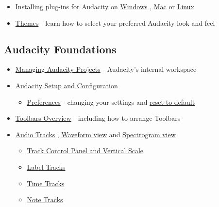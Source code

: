 \begin{multicols}{2}
\begin{itemize}
\item Installing plug-ins for Audacity on 
\hyperref[\foo{manXinstallingXeffectXgeneratorXandXanalyzerXplugXinsXonXwindowsX}]{Windows}
, 
\hyperref[\foo{manXinstallingXeffectXgeneratorXandXanalyzerXplugXinsXonXmacXosXxX}]{Mac}
 or 
\hyperref[\foo{manXinstallingXeffectXgeneratorXandXanalyzerXplugXinsXonXlinuxX}]{Linux}

\item 
\hyperref[\foo{manXthemesX}]{Themes}
 - learn how to select your preferred Audacity look and feel
\end{itemize}

\subsection{Audacity Foundations}
\begin{itemize}
\item 
\hyperref[\foo{manXaudacityXprojectsX}]{Managing Audacity Projects}
 - Audacity's internal workspace 
\item 
\hyperref[\foo{manXaudacityXsetupXandXconfigurationX}]{Audacity Setup and Configuration}

\begin{itemize}
\item 
\hyperref[\foo{manXpreferencesX}]{Preferences}
 - changing your settings and 
\hyperref[\foo{manXfaqXinstallationXandXplugXinsXreset}]{reset to default}

\end{itemize}

\item 
\hyperref[\foo{manXtoolbarsXoverviewX}]{Toolbars Overview}
 - including how to arrange Toolbars
\item 
\hyperref[\foo{manXaudioXtracksX}]{Audio Tracks}
, 
\hyperref[\foo{manXaudacityXwaveformX}]{Waveform view}
 and 
\hyperref[\foo{manXspectrogramXviewX}]{Spectrogram view}

\begin{itemize}
\item 
\hyperref[\foo{manXtrackXcontrolXpanelXandXverticalXscaleX}]{Track Control Panel and Vertical Scale}

\item 
\hyperref[\foo{manXlabelXtracksX}]{Label Tracks}

\item 
\hyperref[\foo{manXtimeXtracksX}]{Time Tracks}

\item 
\hyperref[\foo{manXnoteXtracksX}]{Note Tracks}


\end{itemize}
\end{itemize}
\end{multicols}
